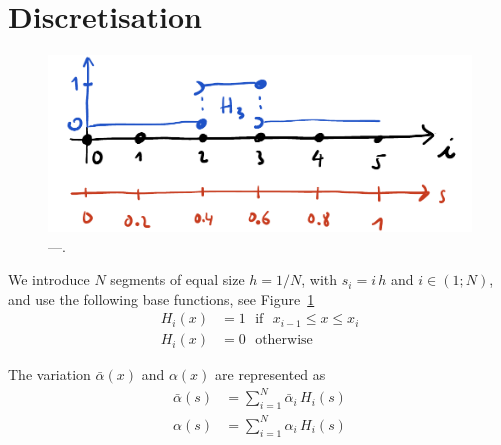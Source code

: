 \documentclass[final,3p,times,authoryear]{elsarticle}
\begin{document}
%
%
%
%
%
%
%
\section{Discretisation} \label{sec:going_discrete}
%
%
%
%
%
%
%
\begin{figure}[htb]
\centering
\includegraphics[width=0.95 \columnwidth]{base_functions}
\caption{\label{fig:base_functions}
---.}
\end{figure}
We introduce $N$ segments of equal size $h=1/N$, with $s_i=i \, h$ and $i \in (1;N)$, and use the following base functions, see Figure~\ref{fig:base_functions}
\begin{subequations}
 \label{eq:base_func}
\begin{align}
H_i(x) &= 1 \text{~ if ~} x_{i-1} \le x \le x_i  \\
H_i(x) &= 0 \text{~ otherwise ~}
\end{align}
\end{subequations}

The variation $\bar{\alpha}(x)$ and $\alpha(x)$ are represented as
\begin{subequations}
\label{eq:discrete_variations}
\begin{align}
\bar{\alpha}(s) &= \sum_{i=1}^N \bar{\alpha}_i \, H_i(s) \label{eq:19a} \\
\alpha(s) &= \sum_{i=1}^N \alpha_i \, H_i(s) \label{eq:19b}
\end{align}
\end{subequations}
\end{document}
